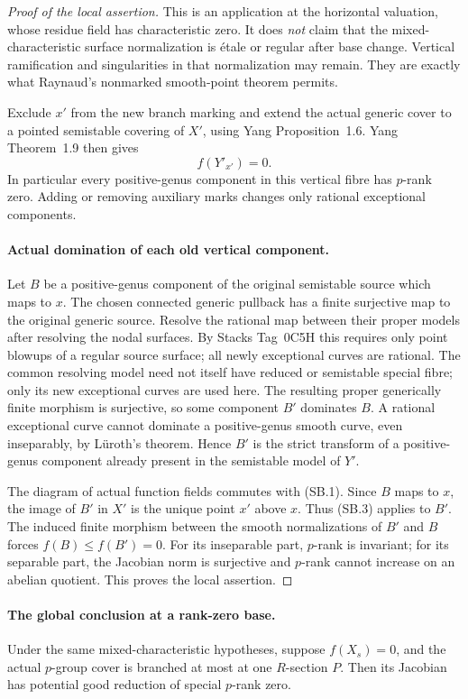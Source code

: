 \begin{proof}[Proof of the local assertion]
This is an application at the horizontal valuation, whose
residue field has characteristic zero. It does \emph{not}
claim that the mixed-characteristic surface normalization
is \'etale or regular after base change. Vertical ramification
and singularities in that normalization may remain.
They are exactly what Raynaud's nonmarked smooth-point
theorem permits.

Exclude \(x'\) from the new branch marking and extend the
actual generic cover to a pointed semistable covering of
\(X'\), using Yang Proposition~1.6. Yang Theorem~1.9
then gives
\[
                    f(Y'_{x'})=0.                        \tag{SB.3}
\]
In particular every positive-genus component in this
vertical fibre has \(p\)-rank zero. Adding or removing
auxiliary marks changes only rational exceptional components.

\paragraph{Actual domination of each old vertical component.}
Let \(B\) be a positive-genus component of the original
semistable source which maps to \(x\). The chosen connected
generic pullback has a finite surjective map to the original
generic source. Resolve the rational map between their proper
models after resolving the nodal surfaces. By Stacks Tag~0C5H this requires
only point blowups of a regular source surface; all newly
exceptional curves are rational. The common resolving model
need not itself have reduced or semistable special fibre;
only its new exceptional curves are used here. The resulting proper
generically finite morphism is surjective, so some component
\(B'\) dominates \(B\). A rational exceptional curve
cannot dominate a positive-genus smooth curve, even
inseparably, by L\"uroth's theorem. Hence \(B'\) is the
strict transform of a positive-genus component already
present in the semistable model of \(Y'\).

The diagram of actual function fields commutes with (SB.1).
Since \(B\) maps to \(x\), the image of \(B'\) in
\(X'\) is the unique point \(x'\) above \(x\).
Thus (SB.3) applies to \(B'\). The induced finite morphism
between the smooth normalizations of \(B'\) and \(B\)
forces \(f(B)\le f(B')=0\). For its inseparable part,
\(p\)-rank is invariant; for its separable part, the
Jacobian norm is surjective and \(p\)-rank cannot increase
on an abelian quotient. This proves the local assertion.
\end{proof}

\paragraph{The global conclusion at a rank-zero base.}
Under the same mixed-characteristic hypotheses, suppose
\(f(X_s)=0\), and the actual \(p\)-group cover is
branched at most at one \(R\)-section \(P\).
Then its Jacobian has potential good reduction of
special \(p\)-rank zero.

